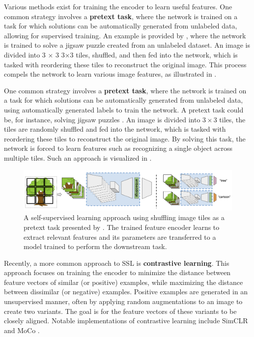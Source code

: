 Various methods exist for training the encoder to learn useful features. One common strategy involves a \textbf{pretext task}, where the network is trained on a task for which solutions can be automatically generated from unlabeled data, allowing for supervised training. An example is provided by \citet{norooziUnsupervisedLearningVisual2016}, where the network is trained to solve a jigsaw puzzle created from an unlabeled dataset. An image is divided into 
3
×
3
3×3 tiles, shuffled, and then fed into the network, which is tasked with reordering these tiles to reconstruct the original image. This process compels the network to learn various image features, as illustrated in .

One common strategy involves a \textbf{pretext task}, where the network is trained on a task for which solutions can be automatically generated from unlabeled data, using automatically generated labels to train the network. A pretext task could be, for instance, solving jigsaw puzzles \cite{norooziUnsupervisedLearningVisual2016}. An image is divided into $3 \times 3$ tiles, the tiles are randomly shuffled and fed into the network, which is tasked with reordering these tiles to reconstruct the original image. By solving this task, the network is forced to learn features such as recognizing a single object across multiple tiles. Such an approach is visualized in .

\begin{figure}[h!]
 \centering
 \includegraphics[width=\linewidth]{images/3/shuffle-to-learn}
 \caption{A self-supervised learning approach using shuffling image tiles as a pretext task presented by \citet{carr2021shuffle}. The trained feature encoder learns to extract relevant features and its parameters are transferred to a model trained to perform the downstream task.}
 \label{fig:ssl-pretext}
\end{figure}

Recently, a more common approach to SSL is \textbf{contrastive learning}.
This approach focuses on training the encoder to minimize the distance between feature vectors of similar (or positive) examples, while maximizing the distance between dissimilar (or negative) examples. Positive examples are generated in an unsupervised manner, often by applying random augmentations to an image to create two variants. The goal is for the feature vectors of these variants to be closely aligned. Notable implementations of contrastive learning include SimCLR \cite{chenSimpleFrameworkContrastive2020} and MoCo \cite{he2019moco}.

